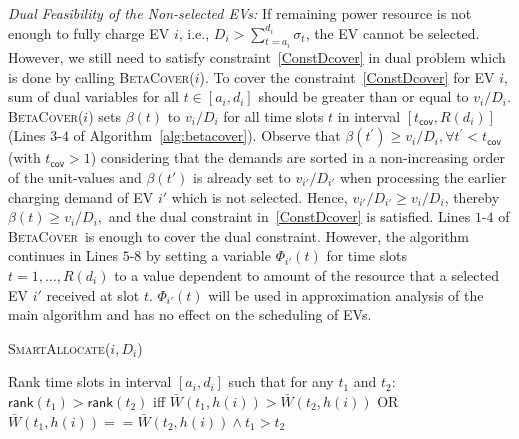 \documentclass[journal]{IEEEtran}
\newcommand{\bt}[1]{{\color{blue}#1}}%
\newcommand{\bt}[1]{#1}
\newcommand{\sa}{\textsc{SmartAllocate}}
\newcommand{\bc}{\textsc{BetaCover}}
\begin{document}
		
\emph{Dual Feasibility of the Non-selected EVs:} \bt{If remaining power resource is not enough} to fully charge EV $i$, i.e.,  $D_i>\sum_{t=a_i}^{d_i}\sigma_t$, the EV cannot be selected. However, we still need to satisfy constraint~\eqref{ConstDcover} in dual problem which is done by calling \bc($i$). To cover the constraint~\eqref{ConstDcover} for EV $i$, sum of dual variables for all $t\in [a_i ,d_i]$ should be greater than or equal to ${v_i \slash D_i}$. \bc($i$) sets $\beta (t)$ to ${v_i \slash D_i}$ for all time slots $t$ in interval $[t_\mathsf{cov}, R(d_i)]$ (Lines $3$-$4$ of Algorithm~\ref{alg:betacover}). Observe that  ${\beta (t^\prime)\geq v_i \slash D_i,\forall t^\prime< t_\mathsf{cov}}$ (with $ t_\mathsf{cov}>1$) considering that the demands are sorted in a non-increasing order of the unit-values and $\beta (t')$ is already set to ${v_{i'} \slash D_{i'}}$ when processing the earlier charging demand of EV $i'$ which is not selected. Hence, ${v_{i'}\slash  D_{i'}\geq v_i \slash D_i}$, thereby ${\beta (t)\geq v_i \slash D_i,}$ and the dual constraint in~\eqref{ConstDcover} is satisfied.		
		Lines $1$-$4$ of \bc\ is enough to cover the dual constraint. However, the algorithm continues in Lines $5$-$8$ by setting a variable $\Phi_{i'}(t)$ for time slots $t=1,\dots ,R(d_i)$ to a value dependent to amount of the resource that a selected EV $i'$ received at slot $t$. $\Phi_{i'}(t)$ will be used in approximation analysis of the main algorithm and has no effect on the scheduling of EVs. 
		\vspace{-3mm}
		\begin{algorithm}%
			\footnotesize
			\caption{\sa($i,D_i$)}
			\label{SmartAllocate}
			\DontPrintSemicolon 
			
			Rank time slots in interval $[a_i,d_i]$ such that for any $t_1$ and $t_2$:
			$\mathsf{rank}(t_1)> \mathsf{rank}(t_2)$ iff $\bar{W}(t_1,h(i))>\bar{W}(t_2,h(i))$ OR $\bar{W}(t_1,h(i))==\bar{W}(t_2,h(i)) \wedge t_1>t_2$ 
			
		\end{algorithm}	
\end{document}

